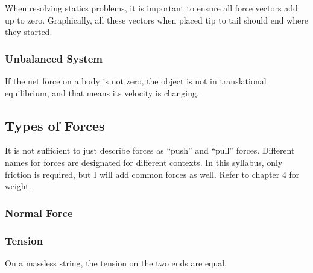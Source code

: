 \documentclass[../main.tex]{subfiles}
\begin{document}
		When resolving statics problems, it is important to ensure all force vectors add up to zero. Graphically, all these vectors when placed tip to tail should end where they started.
			
		\subsubsection{Unbalanced System}
		If the net force on a body is not zero, the object is not in translational equilibrium, and that means its velocity is changing.
			
		
		\subsection{Types of Forces}
		It is not sufficient to just describe forces as ``push'' and ``pull'' forces. Different names for forces are designated for different contexts. In this syllabus, only friction is required, but I will add common forces as well. Refer to chapter 4 for weight.
		
			\subsubsection{Normal Force}
			\begin{center}
			\end{center}
		
			\subsubsection{Tension}
			On a massless string, the tension on the two ends are equal.
			\begin{center}
			\end{center}
		
\end{document}
